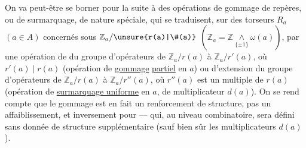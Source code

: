 
On va peut-être se borner pour la suite à des opérations de gommage de repères, ou de surmarquage, de nature spéciale, qui se traduisent, sur  des torseurs $R_a$ $(a\in A)$ concernés sous $\mathbb Z_a/\unsure{r(a)|\#(a)}$  $(\mathbb Z_a=\mathbb Z\mathbin{\underset{\{\pm1\}}{\wedge}}\omega(a))$, par une opération de  du groupe d'opérateurs de $\mathbb Z_a/r(a)$ à $\mathbb Z_a/r'(a)$, où $r'(a)\mid r(a)$ (opération de \uline{gommage} \uline{partiel}  en $a$) ou d'extension du groupe d'opérateurs de $\mathbb Z_a/r(a)$ à $\mathbb Z_a/r''(a)$, où $r''(a)$  est un multiple de $r(a)$ (opération de \uline{surmarquage uniforme} en $a$, \deleted{\unsure{)}} de multiplicateur $d(a)$). On se rend compte  que le gommage  est en fait un renforcement de structure, pas un affaiblissement, et inversement pour  --- qui, au niveau combinatoire, sera défini sans donnée de structure supplémentaire (sauf bien sûr les multiplicateurs $d(a)$).

